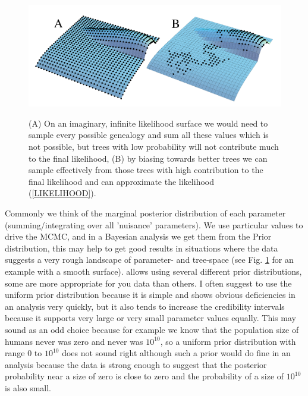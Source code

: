 \begin{figure}[tbh]
\begin{center}
\leavevmode
\hbox{%
\includegraphics[scale=0.8]{mim/planes_orig}}
\end{center}
\caption{
(A) On an imaginary, infinite likelihood surface  we would need to sample every possible
genealogy and sum all these values which is not possible, but trees with low probability will not contribute much to the final likelihood,  (B) by biasing towards better trees we can sample effectively from those trees with high 
contribution to the final likelihood and can approximate the likelihood (\ref{LIKELIHOOD}).
}
\label{FIG3}
\end{figure}

Commonly we think of the marginal posterior distribution of each parameter (summing/integrating over all 'nuisance' parameters). We use particular values to drive the MCMC, and in a Bayesian analysis we get them from the Prior distribution, this may help to get good results in situations where the data suggests a very rough landscape of parameter- and tree-space (see Fig. \ref{FIG3} for an example with a smooth surface). \migrate allows using several different prior distributions, some are more appropriate for you data than others. I often suggest to use the uniform prior distribution because it is simple and shows obvious deficiencies in an analysis very quickly, but it also tends to increase the credibility intervals because it supports very large or very small parameter values equally. This may sound as an odd choice because for example we know that the population size of humans never was zero and never was $10^{10}$, so a uniform prior distribution with range 0 to $10^{10}$ does not sound right although such a prior would do fine in an analysis because the data is strong enough to suggest that the posterior probability near a size of zero is close to zero and the probability of a size of $10^{10}$ is also small.
 
